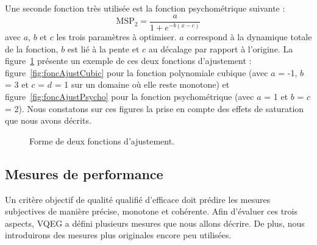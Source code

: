 Une seconde fonction très utilisée est la fonction psychométrique suivante :
\begin{equation}
\text{MSP}_2 = \frac{a}{1+e^{-b(x - c)}} \label{eq:funcPsycho}
\end{equation}
%
avec $a$, $b$ et $c$ les trois paramètres à optimiser. $a$ correspond à la dynamique totale de la fonction, $b$ est lié à la pente et $c$ au décalage par rapport à l'origine. La figure~\ref{fig:foncAjust} présente un exemple de ces deux fonctions d'ajustement : figure~\ref{fig:foncAjustCubic} pour la fonction polynomiale cubique (avec $a$ = -1, $b$ = 3 et $c$ = $d$ = 1 sur un domaine où elle reste monotone) et figure~\ref{fig:foncAjustPsycho} pour la fonction psychométrique (avec $a$ = 1 et $b$ = $c$ = 2). Nous constatons sur ces figures la prise en compte des effets de saturation que nous avons décrits.

\shorthandoff{:} %
\begin{figure}[htbp]
	\centering
	\hfill
	\caption{Forme de deux fonctions d'ajustement.}
	\label{fig:foncAjust}
\end{figure}
\shorthandon{:}


\subsection{Mesures de performance}
Un critère objectif de qualité qualifié d'efficace doit prédire les mesures subjectives de manière précise, monotone et cohérente. Afin d'évaluer ces trois aspects, VQEG a défini plusieurs mesures que nous allons décrire. De plus, nous introduirons des mesures plus originales encore peu utilisées.


